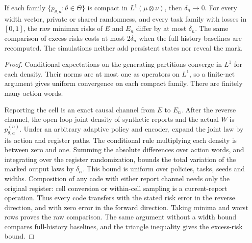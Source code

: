 \begin{theorem}\label{thm:v10-approximation}
If each family $\{p_{\theta,a}:\theta\in\Theta\}$ is compact in
$L^1(\mu\otimes\nu)$, then $\delta_n\to0$. For every width vector,
private or shared randomness, and every task family with losses in
$[0,1]$, the raw minimax risks of $E$ and $E_n$ differ by at most
$\delta_n$. The same comparison of excess risks costs at most
$2\delta_n$ when the full-history baselines are recomputed. The
simulations neither add persistent states nor reveal the mark.
\end{theorem}
\begin{proof}
Conditional expectations on the generating partitions converge in
$L^1$ for each density. Their norms are at most one as operators on
$L^1$, so a finite-net argument gives uniform convergence on each
compact family. There are finitely many action words.

Reporting the cell is an exact causal channel from $E$ to $E_n$.
After the reverse channel, the open-loop joint density of synthetic
reports and the actual $W$ is $p^{(n)}_{\theta,a}$. Under an arbitrary
adaptive policy and encoder, expand the joint law by its action and
register paths. The conditional rule multiplying each density is
between zero and one. Summing the absolute differences over action
words, and integrating over the register randomization, bounds the
total variation of the marked output laws by $\delta_n$. This bound
is uniform over policies, tasks, seeds and widths. Composition of
any code with either report channel needs only the original register:
cell conversion or within-cell sampling is a current-report operation.
Thus every code transfers with the stated risk error in the reverse
direction, and with zero error in the forward direction. Taking
minima and worst rows proves the raw comparison. The same argument
without a width bound compares full-history baselines, and the triangle
inequality gives the excess-risk bound.
\end{proof}
